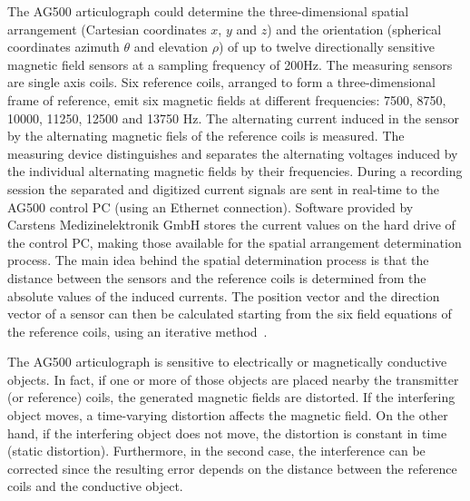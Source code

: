 The AG500 articulograph could determine the three-dimensional spatial 
arrangement (Cartesian coordinates $x$, $y$ and $z$) and the orientation
(spherical coordinates azimuth $\theta$ and elevation $\rho$)
of up to twelve 
directionally sensitive magnetic field sensors at a sampling frequency of 200Hz.
The measuring sensors are single axis coils.
Six reference coils, arranged to form a three-dimensional frame of
reference, emit six magnetic fields at different frequencies:
7500, 8750, 10000, 11250, 12500 and 13750 Hz.
The alternating current induced in the sensor by the alternating magnetic fiels
of the reference coils is measured.
The measuring device distinguishes and separates the alternating voltages
induced by the individual alternating magnetic fields by their 
frequencies.
During a recording session the separated and digitized current signals are
sent in real-time to the AG500 control PC (using an Ethernet connection).
Software provided by Carstens Medizinelektronik GmbH stores the current values
on the hard drive of the control PC, making those available for the spatial 
arrangement determination process.
The main idea behind the spatial determination process is that the distance 
between the sensors and the reference coils is determined from the
absolute values of the induced currents. 
The position vector and the direction vector of a sensor can then be calculated
starting from the six field equations of the reference coils, using an iterative
method~\citep{zierdt.carstens:1993}.


The AG500 articulograph is sensitive to electrically or magnetically conductive
objects. 
In fact, if one or more of those objects are placed nearby the transmitter (or
reference) coils, the generated magnetic fields are distorted.
If the interfering object moves, a time-varying distortion affects the
magnetic field.
On the other hand, if the interfering object does not move, the
distortion is constant in time (static distortion). 
Furthermore, in the second case, the interference can be
corrected since the resulting error depends on the distance between the
reference coils and the conductive object.


